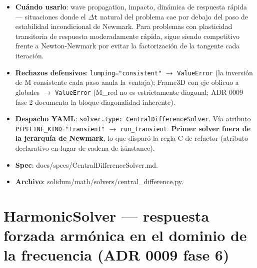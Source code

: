 \documentclass[11pt,letterpaper,oneside]{report}
\begin{document}
\begin{itemize}
  \item \textbf{Cuándo usarlo}: wave propagation, impacto, dinámica de respuesta rápida --- situaciones donde el \texttt{\ensuremath{\Delta}t} natural del problema cae por debajo del paso de estabilidad incondicional de Newmark. Para problemas con plasticidad transitoria de respuesta moderadamente rápida, sigue siendo competitivo frente a Newton-Newmark por evitar la factorización de la tangente cada iteración.
  \item \textbf{Rechazos defensivos}: \texttt{lumping="consistent"} \ensuremath{\to} \texttt{ValueError} (la inversión de M consistente cada paso anula la ventaja); Frame3D con eje oblicuo a globales \ensuremath{\to} \texttt{ValueError} (M\_red no es estrictamente diagonal; ADR 0009 fase 2 documenta la bloque-diagonalidad inherente).
  \item \textbf{Despacho YAML}: \texttt{solver.type: CentralDifferenceSolver}. Vía atributo \texttt{PIPELINE\_KIND="transient"} \ensuremath{\to} \texttt{run\_transient}. \textbf{Primer solver fuera de la jerarquía de Newmark}, lo que disparó la regla C de refactor (atributo declarativo en lugar de cadena de isinstance).
  \item \textbf{Spec}: docs/specs/CentralDifferenceSolver.md.
  \item \textbf{Archivo}: solidum/math/solvers/central\_difference.py.
\end{itemize}


\section{HarmonicSolver --- respuesta forzada armónica en el dominio de la frecuencia (ADR 0009 fase 6)}
\end{document}
